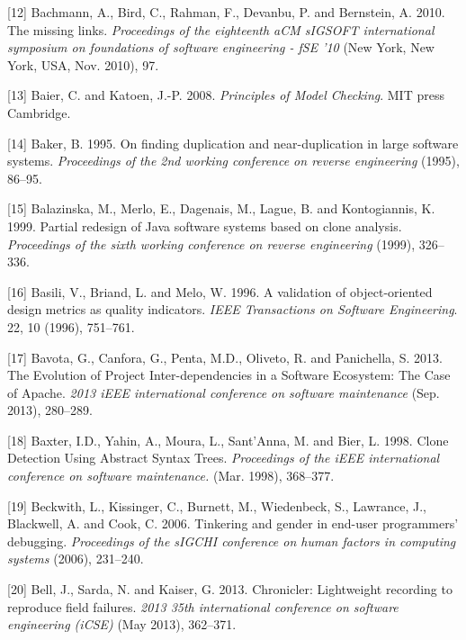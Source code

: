 \documentclass[12pt]{report}
\begin{document}
\hypertarget{ref-Bachmann2010}{}
{[}12{]} Bachmann, A., Bird, C., Rahman, F., Devanbu, P. and Bernstein,
A. 2010. The missing links. \emph{Proceedings of the eighteenth aCM
sIGSOFT international symposium on foundations of software engineering -
fSE '10} (New York, New York, USA, Nov. 2010), 97.

\hypertarget{ref-Baier2008}{}
{[}13{]} Baier, C. and Katoen, J.-P. 2008. \emph{Principles of Model
Checking}. MIT press Cambridge.

\hypertarget{ref-Baker}{}
{[}14{]} Baker, B. 1995. On finding duplication and near-duplication in
large software systems. \emph{Proceedings of the 2nd working conference
on reverse engineering} (1995), 86--95.

\hypertarget{ref-Balazinska}{}
{[}15{]} Balazinska, M., Merlo, E., Dagenais, M., Lague, B. and
Kontogiannis, K. 1999. Partial redesign of Java software systems based
on clone analysis. \emph{Proceedings of the sixth working conference on
reverse engineering} (1999), 326--336.

\hypertarget{ref-Basili1996}{}
{[}16{]} Basili, V., Briand, L. and Melo, W. 1996. A validation of
object-oriented design metrics as quality indicators. \emph{IEEE
Transactions on Software Engineering}. 22, 10 (1996), 751--761.

\hypertarget{ref-Bavota2013}{}
{[}17{]} Bavota, G., Canfora, G., Penta, M.D., Oliveto, R. and
Panichella, S. 2013. The Evolution of Project Inter-dependencies in a
Software Ecosystem: The Case of Apache. \emph{2013 iEEE international
conference on software maintenance} (Sep. 2013), 280--289.

\hypertarget{ref-Baxter1998}{}
{[}18{]} Baxter, I.D., Yahin, A., Moura, L., Sant'Anna, M. and Bier, L.
1998. Clone Detection Using Abstract Syntax Trees. \emph{Proceedings of
the iEEE international conference on software maintenance.} (Mar. 1998),
368--377.

\hypertarget{ref-Beckwith2006}{}
{[}19{]} Beckwith, L., Kissinger, C., Burnett, M., Wiedenbeck, S.,
Lawrance, J., Blackwell, A. and Cook, C. 2006. Tinkering and gender in
end-user programmers' debugging. \emph{Proceedings of the sIGCHI
conference on human factors in computing systems} (2006), 231--240.

\hypertarget{ref-Bell2013}{}
{[}20{]} Bell, J., Sarda, N. and Kaiser, G. 2013. Chronicler:
Lightweight recording to reproduce field failures. \emph{2013 35th
international conference on software engineering (iCSE)} (May 2013),
362--371.
\end{document}
